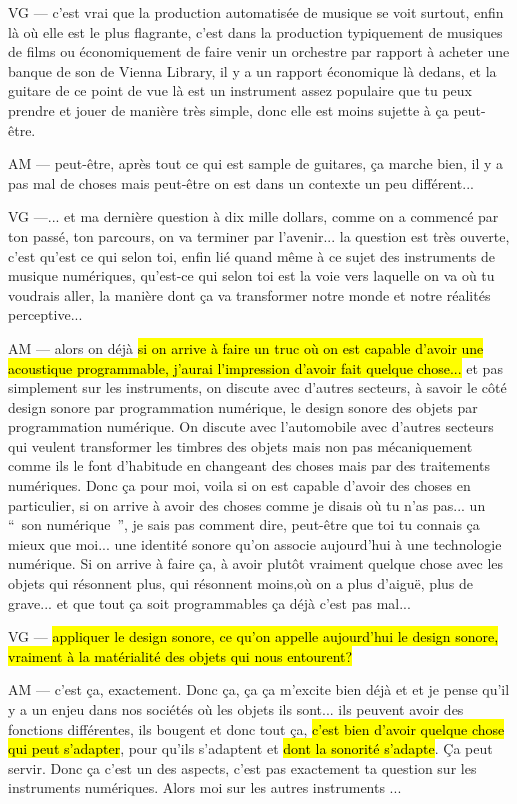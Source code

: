 VG — c'est vrai que la production automatisée de musique se voit surtout, enfin là où elle est le plus flagrante, c'est dans la production typiquement de musiques de films ou économiquement de faire venir un orchestre par rapport à acheter une banque de son de Vienna Library, il y a un rapport économique là dedans, et la guitare de ce point de vue là est un instrument assez populaire que tu peux prendre et jouer de manière très simple, donc elle est moins sujette à ça peut-être.

AM — peut-être, après tout ce qui est sample de guitares, ça marche bien, il y a pas mal de choses mais peut-être on est dans un contexte un peu différent... 

VG —... et ma dernière question à dix mille dollars, comme on a commencé par ton passé, ton parcours, on va terminer par l'avenir... la question est très ouverte, c'est qu'est ce qui selon toi, enfin lié quand même à ce sujet des instruments de musique numériques, qu'est-ce qui selon toi est la voie vers laquelle on va où tu voudrais aller, la manière dont ça va transformer notre monde et notre réalités perceptive... 

AM — alors on déjà \hl{si on arrive à faire un truc où on est capable d'avoir une acoustique programmable, j'aurai l'impression d'avoir fait quelque chose...} et pas simplement sur les instruments, on discute avec d'autres secteurs, à savoir le côté design sonore par programmation numérique, le design sonore des objets par programmation numérique. On discute avec l'automobile avec d'autres secteurs qui veulent transformer les timbres des objets mais non pas mécaniquement comme ils le font d'habitude en changeant des choses mais par des traitements numériques. Donc ça pour moi, voila si on est capable d'avoir des choses en particulier, si on arrive à avoir des choses comme je disais où tu n'as pas... un “ son numérique ”, je sais pas comment dire, peut-être que toi tu connais ça mieux que moi... une identité sonore qu'on associe aujourd'hui à une technologie numérique. Si on arrive à faire ça, à avoir plutôt vraiment quelque chose avec les objets qui résonnent plus, qui résonnent moins,où on a plus d'aiguë, plus de grave... et que tout ça soit programmables ça déjà c'est pas mal... 

VG — \hl{appliquer le design sonore, ce qu'on appelle aujourd'hui le design sonore, vraiment à la matérialité des objets qui nous entourent?}

AM — c'est ça, exactement. Donc ça, ça ça m'excite bien déjà et et je pense qu'il y a un enjeu dans nos sociétés où les objets ils sont... ils peuvent avoir des fonctions différentes, ils bougent et donc tout ça, \hl{c'est bien d'avoir quelque chose qui peut s'adapter}, pour qu'ils s'adaptent et \hl{dont la sonorité s'adapte}. Ça peut servir. Donc ça c'est un des aspects, c'est pas exactement ta question sur les instruments numériques. Alors moi sur les autres instruments ...

